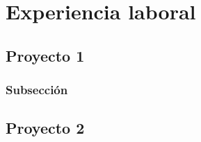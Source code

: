 \documentclass[protocolo.tex]{subfiles}
\begin{document}
\section{Experiencia laboral}

\subsection{Proyecto 1}

\subsubsection{Subsección}

\subsection{Proyecto 2}
\end{document}
